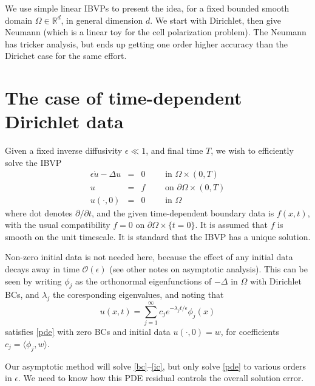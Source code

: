 \documentclass[10pt]{article}
\newcommand{\bea}{\begin{eqnarray}}
\newcommand{\eea}{\end{eqnarray}}
\newcommand{\R}{\mathbb{R}}
\newcommand{\bigO}{{\mathcal O}}
\newcommand{\pO}{{\partial\Omega}}
\newcommand{\eps}{\epsilon}
\begin{document}
We use simple linear IBVPs to present the idea, for a fixed
bounded smooth domain $\Omega \in \R^d$, in general dimension $d$.
We start with Dirichlet, then give Neumann (which is a linear toy for the
cell polarization problem).
The Neumann has tricker analysis, but ends up getting one order
higher accuracy than the Dirichet case for the same effort.


\section{The case of time-dependent Dirichlet data}

Given a fixed inverse diffusivity $\eps\ll 1$,
and final time $T$,
we wish to efficiently solve the IBVP
\bea
\eps\dot{u} - \Delta u &=& 0    \qquad \mbox{ in } \Omega\times (0,T)
\label{pde}
\\
u  &=& f  \qquad \mbox{ on } \pO \times (0,T)
\label{bc}
\\
u(\cdot, 0)    &=&  0 \qquad \mbox{ in } \Omega
\label{ic}
\eea
where dot denotes $\partial/\partial t$, and the given
time-dependent boundary data is $f(x,t)$,
with the usual compatibility $f=0$ on  $\pO\times\{t=0\}$.
It is assumed that $f$ is smooth on the unit timescale.
It is standard that the IBVP has a unique solution.

Non-zero initial data is not needed here,
because the effect of any initial data decays away
in time $\bigO(\eps)$ (see other notes on asymptotic analysis).
This can be seen by writing $\phi_j$ as the orthonormal eigenfunctions
of $-\Delta$ in $\Omega$ with Dirichlet BCs, and $\lambda_j$
the coresponding eigenvalues, and noting that
$$
u(x,t) = \sum_{j=1}^\infty c_j e^{-\lambda_jt/\eps} \phi_j(x)
$$
satisfies \eqref{pde} with zero BCs and initial data $u(\cdot,0)=w$,
for coefficients $c_j = \langle \phi_j, w \rangle$.

Our asymptotic method will solve \eqref{bc}--\eqref{ic}, but
only solve \eqref{pde} to various orders in $\eps$.
We need to know how this PDE residual controls the overall solution error.
\end{document}
